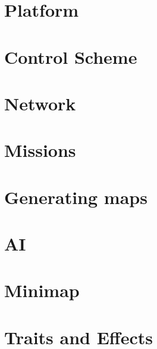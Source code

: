 \chapter{Platform}


\chapter{Control Scheme}



\chapter{Network}


\chapter{Missions}\label{chapter:modules:missions}


\chapter{Generating maps}


\chapter{AI}


\chapter{Minimap}


\chapter{Traits and Effects}
